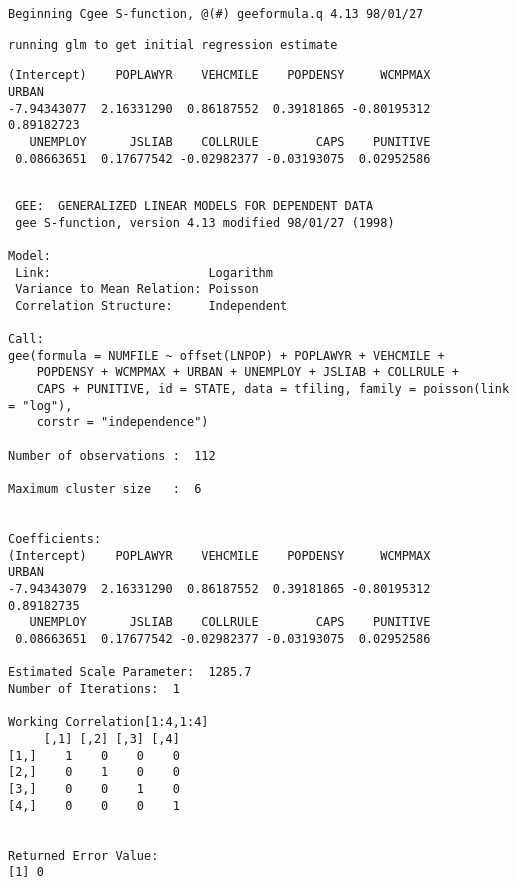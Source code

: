 \documentclass[]{book}
\begin{document}
\begin{verbatim}
Beginning Cgee S-function, @(#) geeformula.q 4.13 98/01/27
\end{verbatim}

\begin{verbatim}
running glm to get initial regression estimate
\end{verbatim}

\begin{verbatim}
(Intercept)    POPLAWYR    VEHCMILE    POPDENSY     WCMPMAX       URBAN 
-7.94343077  2.16331290  0.86187552  0.39181865 -0.80195312  0.89182723 
   UNEMPLOY      JSLIAB    COLLRULE        CAPS    PUNITIVE 
 0.08663651  0.17677542 -0.02982377 -0.03193075  0.02952586 
\end{verbatim}

\begin{verbatim}

 GEE:  GENERALIZED LINEAR MODELS FOR DEPENDENT DATA
 gee S-function, version 4.13 modified 98/01/27 (1998) 

Model:
 Link:                      Logarithm 
 Variance to Mean Relation: Poisson 
 Correlation Structure:     Independent 

Call:
gee(formula = NUMFILE ~ offset(LNPOP) + POPLAWYR + VEHCMILE + 
    POPDENSY + WCMPMAX + URBAN + UNEMPLOY + JSLIAB + COLLRULE + 
    CAPS + PUNITIVE, id = STATE, data = tfiling, family = poisson(link = "log"), 
    corstr = "independence")

Number of observations :  112 

Maximum cluster size   :  6 


Coefficients:
(Intercept)    POPLAWYR    VEHCMILE    POPDENSY     WCMPMAX       URBAN 
-7.94343079  2.16331290  0.86187552  0.39181865 -0.80195312  0.89182735 
   UNEMPLOY      JSLIAB    COLLRULE        CAPS    PUNITIVE 
 0.08663651  0.17677542 -0.02982377 -0.03193075  0.02952586 

Estimated Scale Parameter:  1285.7
Number of Iterations:  1

Working Correlation[1:4,1:4]
     [,1] [,2] [,3] [,4]
[1,]    1    0    0    0
[2,]    0    1    0    0
[3,]    0    0    1    0
[4,]    0    0    0    1


Returned Error Value:
[1] 0
\end{verbatim}
\end{document}
